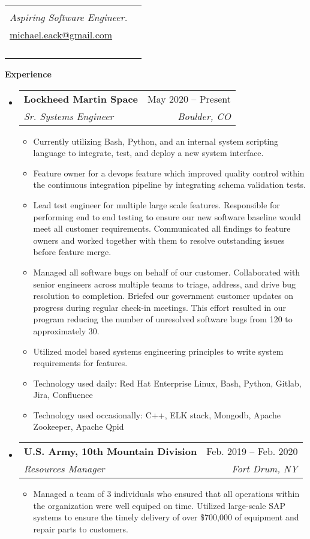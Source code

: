 \documentclass[letterpaper,12pt]{article}[leftmargin=*]
\makeatletter
\def \fullname {Michael Eack}
\def \subtitle {Aspiring Software Engineer.}
\def \emailicon {\faEnvelope}
\def \emaillink {mailto:michael.eack@gmail.com}
\def \emailtext {michael.eack@gmail.com}
\def \linkedinicon {\faLinkedin}
\def \linkedinlink {https://linkedin.com/in/michael-eack/}
\def \linkedintext {/michael-eack}
\def \phoneicon {\faPhone}
\def \phonetext {+1-309-532-0942}
\def \headertype {\singlecol} %
\def \entryspacing {-0pt}
\def \email {\emailicon \hspace{3pt}\href{\emaillink}{\emailtext}}
\def \linkedin {\linkedinicon \hspace{3pt}\href{\linkedinlink}{\linkedintext}}
\def \phone {\phoneicon \hspace{3pt}{ \phonetext}}
\renewcommand{\section}[2]{\vspace{5pt}
  \colorbox{secondary}{\color{white}\raggedbottom\normalsize\textbf{{#1}{\hspace{7pt}#2}}}
}
\newcommand{\resumeEntryStart}{\begin{itemize}[leftmargin=2.5mm]}
\newcommand{\resumeEntryEnd}{\end{itemize}\vspace{\entryspacing}}
\newcommand{\resumeItemListStart}{\begin{itemize}[leftmargin=4.5mm]}
\newcommand{\resumeItemListEnd}{\end{itemize}}
\newcommand{\resumeItem}[1]{
  \item\small{
    {#1 \vspace{-2pt}}
  }
}
\newcommand{\resumeEntryTSDL}[4]{
  \vspace{-1pt}\item[]
    \begin{tabularx}{0.97\textwidth}{X@{\hspace{60pt}}r}
      \textbf{\color{primary}#1} & {\firabook\color{accent}\small#2} \\
      \textit{\color{accent}\small#3} & \textit{\color{accent}\small#4} \\
    \end{tabularx}\vspace{-6pt}
}
\newcommand{\doublecol}[6]{
  \begin{tabularx}{\textwidth}{Xr}
    {
      \begin{tabular}[c]{l}
        \fontsize{35}{45}\selectfont{\color{primary}{{\textbf{\fullname}}}} \\
        {\textit{\subtitle}} %
      \end{tabular}
    } & {
      \begin{tabular}[c]{l@{\hspace{1.5em}}l}
        {\small#4} & {\small#1} \\
        {\small#5} & {\small#2} \\
        {\small#6} & {\small#3}
      \end{tabular}
    }
  \end{tabularx}
}
\newcommand{\singlecol}[6]{
  \begin{tabularx}{\textwidth}{Xr}
    {
      \begin{tabular}[b]{l}
        \fontsize{35}{45}\selectfont{\color{primary}{{\textbf{\fullname}}}} \\
        {\textit{\subtitle}} %
      \end{tabular}
    } & {
      \begin{tabular}[c]{l}
        {\small#1} \\
        {\small#2} \\
        {\small#3} \\
        {\small#4} \\
        {\small#5} \\
        {\small#6}
      \end{tabular}
    }
  \end{tabularx}
}
\makeatother
\begin{document}


\headertype{\linkedin}{\email}{\phone}{\github}{\website}{} %
\vspace{-10pt} %


\section{\faPieChart}{Experience}

  \resumeEntryStart
    \resumeEntryTSDL
      {Lockheed Martin Space}{May 2020 -- Present}
      {Sr. Systems Engineer}{Boulder, CO}
    \resumeItemListStart
      \resumeItem{Currently utilizing Bash, Python, and an internal system scripting language to integrate, test, and deploy a new system interface.}
      \resumeItem {Feature owner for a devops feature which improved quality control within the continuous integration pipeline by integrating schema validation tests.}
      \resumeItem {Lead test engineer for multiple large scale features. Responsible for performing end to end testing to ensure our new software baseline would meet all customer requirements. Communicated all findings to feature owners and worked together with them to resolve outstanding issues before feature merge.}
      \resumeItem{Managed all software bugs on behalf of our customer. Collaborated with senior engineers across multiple teams to triage, address, and drive bug resolution to completion. Briefed our government customer updates on progress during regular check-in meetings. This effort resulted in our program reducing the number of unresolved software bugs from 120 to approximately 30.}
      \resumeItem {Utilized model based systems engineering principles to write system requirements for features.}
      \resumeItem {Technology used daily: Red Hat Enterprise Linux, Bash, Python, Gitlab, Jira, Confluence}
      \resumeItem {Technology used occasionally: C++, ELK stack, Mongodb, Apache Zookeeper, Apache Qpid}
    \resumeItemListEnd
  \resumeEntryEnd

  \resumeEntryStart
    \resumeEntryTSDL
      {U.S. Army, 10th Mountain Division}{Feb. 2019 -- Feb. 2020}
      {Resources Manager}{Fort Drum, NY}
    \resumeItemListStart
      \resumeItem {Managed a team of 3 individuals who ensured that all operations within the organization were well equiped on time. Utilized large-scale SAP systems to ensure the timely delivery of over \$700,000 of equipment and repair parts to customers. }
    \resumeItemListEnd
  \resumeEntryEnd
\end{document}
